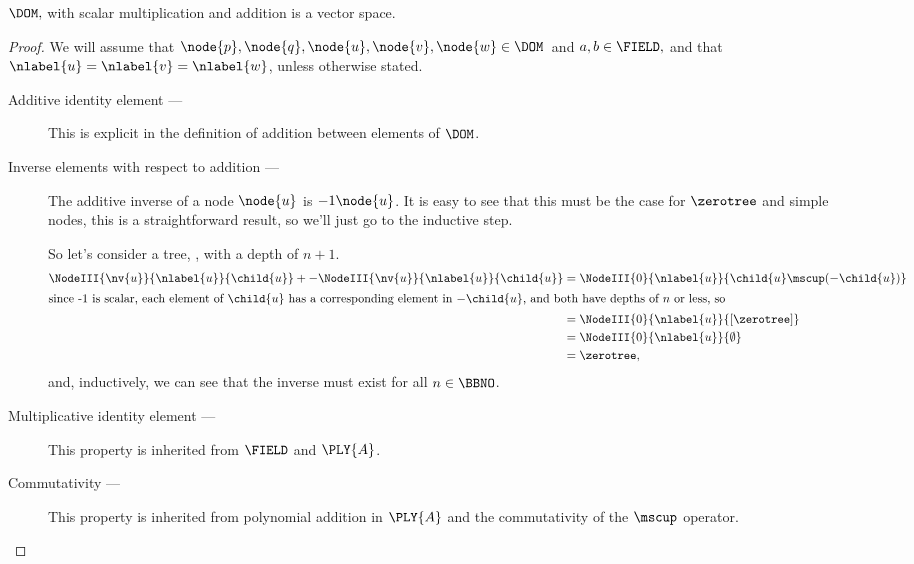 \begin{proposition}\label{vspace} $\DOM,$ with scalar multiplication and addition is a vector space.
  \begin{proof}
    We will assume that  $\node{p}, \node{q}, \node{u},\node{v},\node{w} \in \DOM$\ and $a, b \in  \FIELD,$ and that
    $\nlabel{u}=\nlabel{v}=\nlabel{w}$, unless otherwise stated.

    \begin{description} 
    \item[Additive identity element --- ]

      This is explicit in the definition of addition between elements
      of $\DOM$.

    \item[Inverse elements with respect to addition --- ]

      The additive inverse of a node $\node{u}$ is $-1\node{u}$. It is easy to see that
      this must be the case for $\zerotree$ and simple nodes, this is a
      straightforward result, so we'll just go to the inductive step.

      \goodbreak
      So let's consider a tree, , with a depth of $n+1$.
      \begin{align*}
        \NodeIII{\nv{u}}{\nlabel{u}}{\child{u}} + -\NodeIII{\nv{u}}{\nlabel{u}}{\child{u}}&=\NodeIII{0}{\nlabel{u}}{\child{u}\mscup(-\child{u})}\\
        \intertext{since -1 is scalar, each element of $\child{u}$ has a corresponding
          element in $-\child{u}$, and both have depths of $n$ or less, so}
        &= \NodeIII{0}{\nlabel{u}}{[\zerotree]}\\
        &=\NodeIII{0}{\nlabel{u}}{\emptyset} \\
        &= \zerotree,
      \end{align*}
      and, inductively, we can see that the inverse must exist for all $n\in\BBNO$.

    \item[Multiplicative identity element --- ]

      This property is inherited from $\FIELD$ and $\PLY{A}$.

    \item[Commutativity --- ]

      This property is inherited from polynomial addition in $\PLY{A}$
      and the commutativity of the $\mscup$ operator. 


\end{description}
\end{proof}
\end{proposition}
